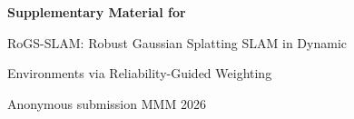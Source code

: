 \documentclass[10pt]{article}
\begin{document}
\begin{center}
{\Large\bfseries Supplementary Material for\par
RoGS-SLAM: Robust Gaussian Splatting SLAM in Dynamic\par
Environments via Reliability-Guided Weighting}\par
\vspace{3pt}
{\small Anonymous submission \textemdash{} MMM 2026}
\end{center}

\end{document}
